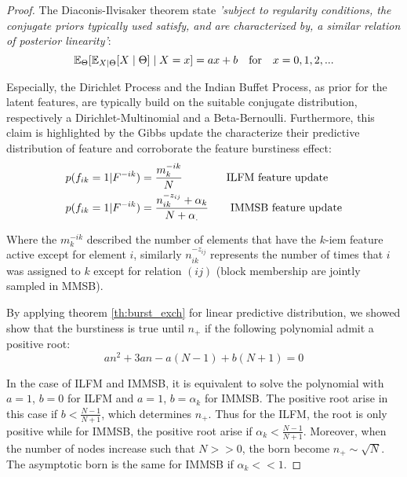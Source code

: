\begin{proof}
The Diaconis-Ilvisaker theorem \cite{diaconis1979conjugate} state \emph{'subject to regularity conditions, the conjugate priors typically used satisfy, and are characterized by, a  similar relation of posterior linearity'}:
\begin{equation}
\mathbb{E}_\Theta[\mathbb{E}_{X|\Theta}[X\mid \Theta] \mid X=x] = ax+b \quad \textnormal{for} \quad x=0,1,2,... \nonumber
\end{equation}

Especially, the Dirichlet Process and the Indian Buffet Process, as prior for the latent features, are typically build on the suitable conjugate distribution, respectively a Dirichlet-Multinomial and a Beta-Bernoulli. Furthermore, this claim is highlighted by the Gibbs update the characterize their predictive distribution of feature and corroborate the feature burstiness effect:
\begin{align*} 
&p(f_{ik} = 1 | F^{-ik}) = \frac{m_k^{-ik}}{N} \qquad \hspace{20pt} \textnormal{ILFM feature update} \nonumber \\
&p(f_{ik} = 1 | F^{-ik}) = \frac{n_{ik}^{-z_{ij}}+\alpha_k}{N+\alpha_.} \qquad \textnormal{IMMSB feature update} \nonumber \\
\end{align*}

Where the $m_k^{-ik}$ described the number of elements that have the $k$-iem feature active except for element $i$, similarly $n_{ik}^{-z_{ij}}$ represents the number of times that $i$ was assigned to $k$ except for relation $(ij)$ (block membership are jointly sampled in MMSB).

By applying theorem \ref{th:burst_exch} for linear predictive distribution, we showed show that the burstiness is true until $n_+$ if the following polynomial admit a positive root:
\begin{equation*}
	 an^2 + 3an - a(N-1) + b(N+1) = 0
\end{equation*}

    In the case of ILFM and IMMSB, it is equivalent to solve the polynomial with $a=1$, $b=0$ for ILFM and $a=1$, $b=\alpha_k$ for IMMSB. The positive root arise in this case if $b < \frac{N-1}{N+1}$, which determines $n_+$. Thus for the ILFM, the root is only positive while for IMMSB, the positive root arise if $\alpha_k < \frac{N-1}{N+1}$. Moreover, when the number of nodes increase such that $N >> 0$, the born become $n_+ \sim \sqrt{N}$. The asymptotic born is the same for IMMSB if $\alpha_k << 1$.
\end{proof}

